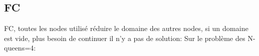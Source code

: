 \begin{multicols}{3}
\end{multicols}
\pagebreak

\subsection{FC}
FC, toutes les nodes utilisé réduire le domaine des autres nodes, si un domaine est vide, plus besoin de continuer il n'y a pas de solution:
Sur le problème des N-queens=4:
\begin{multicols}{3}
\end{multicols}

